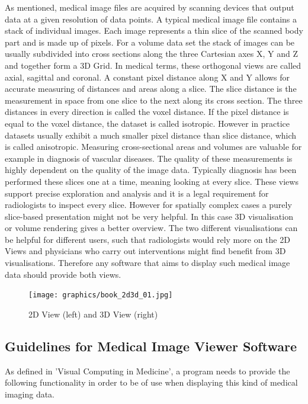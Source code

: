\documentclass[a4paper,11pt,titlepage]{article}
\begin{document}
As mentioned, medical image files are acquired by scanning devices that output data at a given resolution of data points. A typical medical image file contains a stack of individual images. Each image represents a thin slice of the scanned body part and is made up of pixels. For a volume data set the stack of images can be usually subdivided into cross sections along the three Cartesian axes X, Y and Z and together form a 3D Grid. In medical terms, these orthogonal views are called axial, sagittal and coronal. A constant pixel distance along X and Y allows for accurate measuring of distances and areas along a slice. The slice distance is the measurement in space from one slice to the next along its cross section. The three distances in every direction is called the voxel distance. If the pixel distance is equal to the voxel distance, the dataset is called isotropic. However in practice datasets usually exhibit a much smaller pixel distance than slice distance, which is called anisotropic.
Measuring cross-sectional areas and volumes are valuable for example in diagnosis of vascular diseases. The quality of these measurements is highly dependent on the quality of the image data. Typically diagnosis has been performed these slices one at a time, meaning looking at every slice. These views support precise exploration and analysis and it is a legal requirement for radiologists to inspect every slice. However for spatially complex cases a purely slice-based presentation might not be very helpful. In this case 3D visualisation or volume rendering gives a better overview. The two different visualisations can be helpful for different users, such that radiologists would rely more on the 2D Views and physicians who carry out interventions might find benefit from 3D visualisations. Therefore any software that aims to display such medical image data should provide both views.

\begin{figure}[ht!]
\centering
\texttt{[image: graphics/book\_2d3d\_01.jpg]}
\caption{2D View (left) and 3D View (right)}
\label{fig:UIdesign1}
\end{figure}

\subsection{Guidelines for Medical Image Viewer Software}

As defined in 'Visual Computing in Medicine', a program needs to provide the following functionality in order to be of use when displaying this kind of medical imaging data. 
\end{document}
